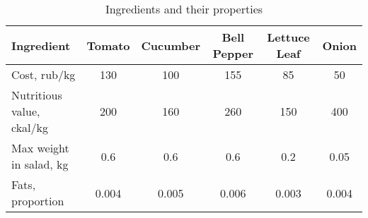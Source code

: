 \documentclass{article}
\begin{document}
\begin{table}[h!]
    \centering
    \begin{tabular}{|p{2cm}||c|c|c|c|c|}
        \hline
        Ingredient                & Tomato & Cucumber & Bell Pepper & Lettuce Leaf & Onion \\
        \hline \hline
        Cost, rub/kg              & 130    & 100      & 155         & 85           & 50    \\
        \hline
        Nutritious value, ckal/kg & 200    & 160      & 260         & 150          & 400   \\
        \hline
        Max weight in salad, kg   & 0.6    & 0.6      & 0.6         & 0.2          & 0.05  \\
        \hline
        Fats, proportion          & 0.004  & 0.005    & 0.006       & 0.003        & 0.004 \\
        \hline
    \end{tabular}
    \caption{Ingredients and their properties}
    \label{table:ingredients}
\end{table}
\end{document}
